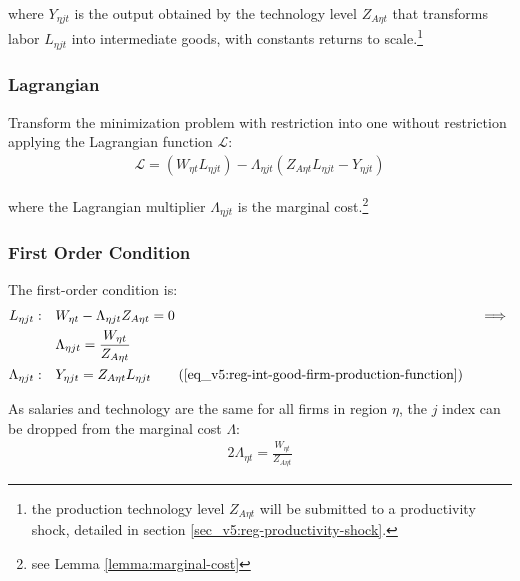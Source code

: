 \documentclass[../thesis.tex]{subfiles}
\begin{document}
where $Y_{\eta jt}$ is the output obtained by the technology level $Z_{A\eta t}$ that transforms labor $L_{\eta jt}$ into intermediate goods, with constants returns to scale.\footnote{the production technology level $Z_{A\eta t}$ will be submitted to a productivity shock, detailed in section \ref{sec_v5:reg-productivity-shock}.}

\subsubsection*{Lagrangian}

Transform the minimization problem with restriction into one without restriction applying the Lagrangian function $\mathcal{L}$:
\begin{align}
	\label{eq_v5:reg-int-good-firm-lagrangian}
	\mathcal{L} = (W_{\eta t} L_{\eta jt}) - \Lambda_{\eta jt} (Z_{A\eta t} L_{\eta jt} - Y_{\eta jt})
\end{align}

where the Lagrangian multiplier $\Lambda_{\eta jt}$ is the marginal cost.\footnote{see Lemma \ref{lemma:marginal-cost}}

\subsubsection*{First Order Condition}

The first-order condition is:
\begin{alignat}{2}
	L_{\eta jt}: \quad & W_{\eta t} - \Lambda_{\eta jt} Z_{A\eta t} = 0 \quad &&\implies \nonumber \\ 
	& \Lambda_{\eta jt} = \frac{W_{\eta t}}{Z_{A\eta t}} \label{eq_v5:reg-int-good-firm-FOC-Lt-0} \\
	\Lambda_{\eta jt}: \quad & Y_{\eta jt} = Z_{A\eta t} L_{\eta jt} \tag{\ref{eq_v5:reg-int-good-firm-production-function}}
\end{alignat}

As salaries and technology are the same for all firms in region $\eta$, the $j$ index can be dropped from the marginal cost $\Lambda$:
\begin{alignat}{2}
	\Lambda_{\eta t} = \frac{W_{\eta t}}{Z_{A\eta t}} \label{eq_v5:reg-int-good-firm-FOC-Lt}
\end{alignat}
\end{document}
